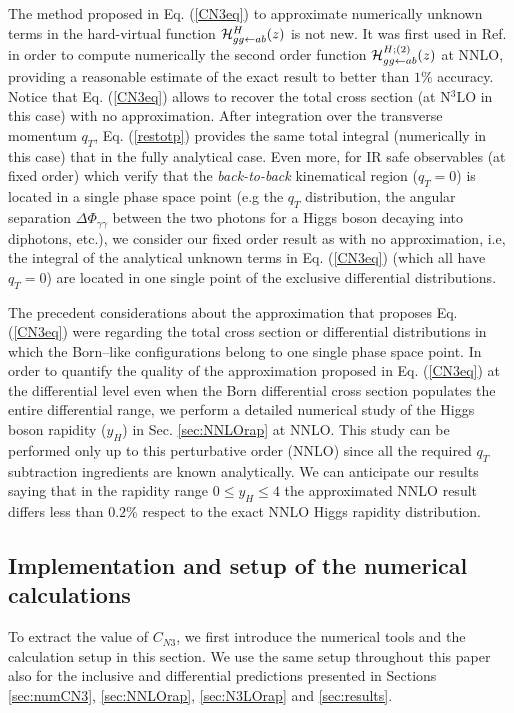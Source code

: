 \documentclass[12pt]{article}
\def\ito{\leftarrow}
\def\qt{q_T}
\begin{document}
The method proposed in Eq. (\ref{CN3eq}) to approximate numerically unknown terms in the hard-virtual function ${\cal H}^H_{gg\ito ab}(z)$ is not new. It was first used in Ref. \cite{Bozzi:2005wk} in order to compute numerically the second order function ${\cal H}^{H;(2)}_{gg\ito ab}(z)$ at NNLO, providing a reasonable estimate of the exact result to better than $1\%$ accuracy. Notice that Eq. (\ref{CN3eq}) allows to recover the total cross section (at N$^{3}$LO in this case) with no approximation. After integration over the transverse momentum $\qt$, Eq. (\ref{restotp}) provides the same total integral (numerically in this case) that in the fully analytical case. Even more, for IR safe observables (at fixed order) which verify that the \textit{back-to-back} kinematical region ($\qt=0$) is located in a single phase space point (e.g the $\qt$ distribution, the angular separation $\Delta \Phi _{\gamma\gamma}$ between the two photons for a Higgs boson decaying into diphotons, etc.), we consider our fixed order result as with no approximation, i.e, the integral of the analytical unknown terms in Eq. (\ref{CN3eq}) (which all have $\qt=0$) are located in one single point of the exclusive differential distributions. 

The precedent considerations about the approximation that proposes Eq. (\ref{CN3eq}) were regarding the total cross section or differential distributions in which the Born--like configurations belong to one single phase space point.
In order to quantify the quality of the approximation proposed in Eq. (\ref{CN3eq}) at the differential level even when the Born differential cross section populates the entire differential range, we perform a detailed numerical study of the Higgs boson rapidity ($y_{H}$) in Sec. \ref{sec:NNLOrap} at NNLO. This study can be performed only up to this perturbative order (NNLO) since all the required $q_{T}$ subtraction ingredients are known analytically. We can anticipate our results saying that in the rapidity range $0\leq y_{H}\leq 4$ the approximated NNLO result differs less than $0.2\%$ respect to the exact NNLO Higgs rapidity distribution.

\subsection{Implementation and setup of the numerical calculations}
\label{sec:numsetup}
To extract the value of $C_{N3}$, we first introduce the numerical tools and the calculation setup in this section. We use the same setup throughout this paper also for the inclusive and differential predictions presented in Sections \ref{sec:numCN3}, \ref{sec:NNLOrap}, \ref{sec:N3LOrap} and \ref{sec:results}.
\end{document}
